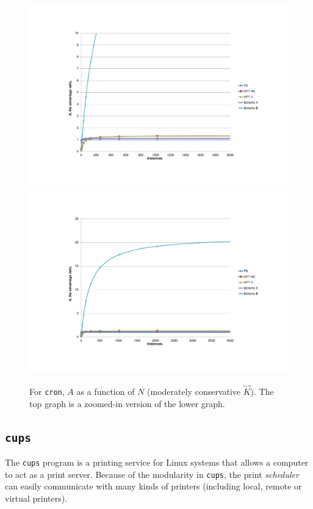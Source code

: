 \begin{figure}
  \centering
  \subfloat%
           {\includegraphics[scale=0.75, trim=5cm 3cm 0cm 4.5cm]{cron-2.pdf} \label{cron2}} \\
  \subfloat%
           {\includegraphics[scale=0.75, trim=5cm 3cm 0cm 3cm]{cron-3.pdf} \label{cron3}} 
  \caption[For \texttt{cron}, $A$ as a function of $N$ (moderately conservative $\vec K$)]%
          {For \texttt{cron}, $A$ as a function of $N$ (moderately conservative $\vec K$).
          The top graph is a zoomed-in version of the lower graph.}
  \label{cron23}
\end{figure}

\newpage
\subsection{\texttt{cups}}
The \texttt{cups} program is a printing service
for Linux systems that allows a computer to act as a print server. 
Because of the modularity in \texttt{cups}, the print {\em scheduler}
can easily communicate with many kinds of printers (including local, remote or
virtual printers).




